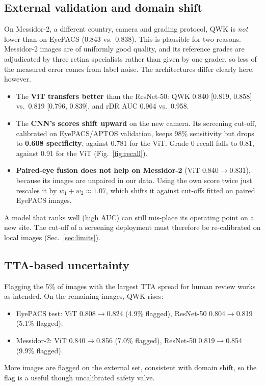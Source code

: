 \documentclass[conference,a4paper]{IEEEtran}
\newcommand{\pmci}[2]{{\scriptsize[#1, #2]}}
\begin{document}
\subsection{External validation and domain shift}
On Messidor-2, a different country, camera and grading protocol, QWK is \emph{not} lower than on EyePACS (0.843 vs.\ 0.838).
This is plausible for two reasons. Messidor-2 images are of uniformly good quality, and its reference grades are adjudicated by three retina specialists rather than given by one grader, so less of the measured error comes from label noise.
The architectures differ clearly here, however.
\begin{itemize}
\item The \textbf{ViT transfers better} than the ResNet-50: QWK 0.840 \pmci{0.819}{0.858} vs.\ 0.819 \pmci{0.796}{0.839}, and rDR AUC 0.964 vs.\ 0.958.
\item The \textbf{CNN's scores shift upward} on the new camera. Its screening cut-off, calibrated on EyePACS/APTOS validation, keeps 98\% sensitivity but drops to \textbf{0.608 specificity}, against 0.781 for the ViT. Grade 0 recall falls to 0.81, against 0.91 for the ViT (Fig.~\ref{fig:recall}).
\item \textbf{Paired-eye fusion does not help on Messidor-2} (ViT 0.840$\rightarrow$0.831), because its images are unpaired in our data. Using the own score twice just rescales it by $w_1+w_2\approx1.07$, which shifts it against cut-offs fitted on paired EyePACS images.
\end{itemize}
A model that ranks well (high AUC) can still mis-place its operating point on a new site. The cut-off of a screening deployment must therefore be re-calibrated on local images (Sec.~\ref{sec:limits}).

\subsection{TTA-based uncertainty}
Flagging the 5\% of images with the largest TTA spread for human review works as intended. On the remaining images, QWK rises:
\begin{itemize}
\item EyePACS test: ViT 0.808$\rightarrow$0.824 (4.9\% flagged), ResNet-50 0.804$\rightarrow$0.819 (5.1\% flagged).
\item Messidor-2: ViT 0.840$\rightarrow$0.856 (7.0\% flagged), ResNet-50 0.819$\rightarrow$0.854 (9.9\% flagged).
\end{itemize}
More images are flagged on the external set, consistent with domain shift, so the flag is a useful though uncalibrated safety valve.
\end{document}
